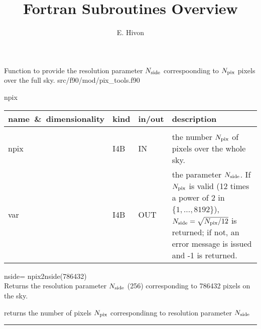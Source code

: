 

\sloppy


\title{\healpix Fortran Subroutines Overview}
 \section[npix2nside]{ }
\label{sub:npix2nside}
\author{E. Hivon}

\begin{facility}
{Function to provide the resolution parameter ${N_{\rm side}}$ correspoonding to ${N_{\rm pix}}$
pixels over the full sky. 
}
{src/f90/mod/pix\_tools.f90}
\end{facility}

\begin{f90function}
{npix}
\end{f90function}

\begin{arguments}
{
\begin{tabular}{p{0.3\hsize} p{0.05\hsize} p{0.1\hsize} p{0.45\hsize}} \hline  
\textbf{name~\&~dimensionality} & \textbf{kind} & \textbf{in/out} & \textbf{description} \\ \hline
                   &   &   &                           \\ %
npix & I4B & IN & the number ${N_{\rm pix}}$ of pixels over the whole sky. \\
var & I4B & OUT & the parameter ${N_{\rm side}}$. If ${N_{\rm pix}}$ is valid (12 times a power of 2 in
$\{1,\ldots,8192\}$), ${N_{\rm side}}=\sqrt{{N_{\rm pix}}/12}$ is returned; if not, an error message is
issued and -1 is returned.\\
\end{tabular}
}
\end{arguments}

\begin{example}
{
nside= npix2nside(786432)  \\
}
{
Returns the resolution parameter ${N_{\rm side}}$ (256) corresponding to 786432 pixels
on the sky.
}
\end{example}
\begin{related}
  \begin{sulist}{} %
  \item[\htmlref{nside2npix}{sub:nside2npix}] returns the number of pixels ${N_{\rm pix}}$ correspondinng to
  resolution parameter ${N_{\rm side}}$
  \end{sulist}
\end{related}

\rule{\hsize}{2mm}

